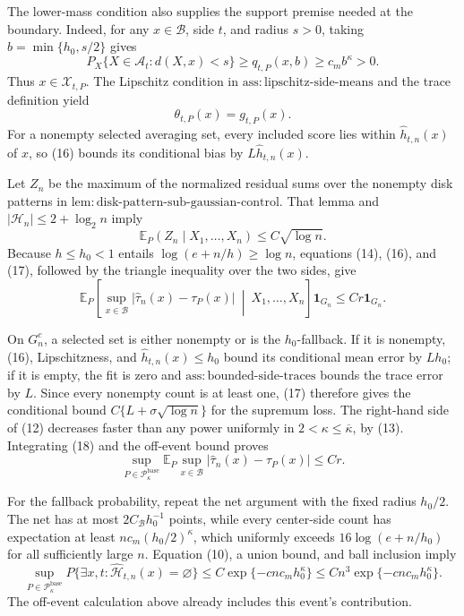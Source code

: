 The lower-mass condition also supplies the support premise needed at the boundary.  Indeed, for any \(x\in\mathcal B\), side \(t\), and radius \(s>0\), taking \(b=\min\{h_0,s/2\}\) gives
\[
 P_X\{X\in\mathcal A_t:d(X,x)<s\}
 \ge q_{t,P}(x,b)\ge c_mb^\kappa>0. \tag{15}
\]
Thus \(x\in\mathcal X_{t,P}\).  The Lipschitz condition in \(\mathrm{ass:lipschitz\text{-}side\text{-}means}\) and the trace definition yield
\[
 \theta_{t,P}(x)=g_{t,P}(x). \tag{16}
\]
For a nonempty selected averaging set, every included score lies within \(\widehat h_{t,n}(x)\) of \(x\), so (16) bounds its conditional bias by \(L\widehat h_{t,n}(x)\).

Let \(Z_n\) be the maximum of the normalized residual sums over the nonempty disk patterns in \(\mathrm{lem:disk\text{-}pattern\text{-}sub\text{-}gaussian\text{-}control}\).  That lemma and \(|\mathcal H_n|\le 2+\log_2 n\) imply
\[
 \mathbb E_P(Z_n\mid X_1,\ldots,X_n)\le C\sqrt{\log n}. \tag{17}
\]
Because \(h\le h_0<1\) entails \(\log(e+n/h)\ge\log n\), equations (14), (16), and (17), followed by the triangle inequality over the two sides, give
\[
 \mathbb E_P\!\left[\sup_{x\in\mathcal B}|\widehat\tau_n(x)-\tau_P(x)|
 \ \middle|\ X_1,\ldots,X_n\right]\mathbf 1_{G_n}
 \le Cr\mathbf 1_{G_n}. \tag{18}
\]

On \(G_n^c\), a selected set is either nonempty or is the \(h_0\)-fallback.  If it is nonempty, (16), Lipschitzness, and \(\widehat h_{t,n}(x)\le h_0\) bound its conditional mean error by \(Lh_0\); if it is empty, the fit is zero and \(\mathrm{ass:bounded\text{-}side\text{-}traces}\) bounds the trace error by \(L\).  Since every nonempty count is at least one, (17) therefore gives the conditional bound \(C\{L+\sigma\sqrt{\log n}\}\) for the supremum loss.  The right-hand side of (12) decreases faster than any power uniformly in \(2<\kappa\le\overline\kappa\), by (13).  Integrating (18) and the off-event bound proves
\[
 \sup_{P\in\mathcal P_{\kappa}^{\mathrm{base}}}
 \mathbb E_P\sup_{x\in\mathcal B}|\widehat\tau_n(x)-\tau_P(x)|
 \le Cr. \tag{19}
\]

For the fallback probability, repeat the net argument with the fixed radius \(h_0/2\).  The net has at most \(2C_{\mathcal B}h_0^{-1}\) points, while every center-side count has expectation at least \(nc_m(h_0/2)^\kappa\), which uniformly exceeds \(16\log(e+n/h_0)\) for all sufficiently large \(n\).  Equation (10), a union bound, and ball inclusion imply
\[
 \sup_{P\in\mathcal P_{\kappa}^{\mathrm{base}}}
 P\{\exists x,t:\widehat{\mathcal H}_{t,n}(x)=\varnothing\}
 \le C\exp\{-c n c_mh_0^\kappa\}
 \le Cn^3\exp\{-c n c_mh_0^\kappa\}. \tag{20}
\]
The off-event calculation above already includes this event's contribution.

